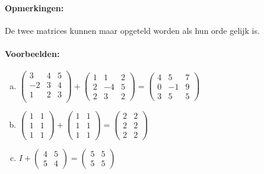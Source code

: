 \documentclass[12pt,twoside]{article}
\begin{document}
\paragraph*{Opmerkingen:} De twee matrices kunnen maar opgeteld worden als hun orde gelijk is.

\paragraph*{Voorbeelden:}

\begin{enumerate}[(a)]
\item
  $
  \begin{pmatrix}
    3 & 4 & 5\\
    -2 & 3 & 4\\
    1 & 2 & 3\\
  \end{pmatrix}
  +
  \begin{pmatrix}
    1 & 1 & 2\\
    2 & -4 & 5\\
    2 & 3 & 2
  \end{pmatrix}
  =
  \begin{pmatrix}
    4 & 5 & 7\\
    0 & -1 & 9\\
    3 & 5 & 5
  \end{pmatrix}
  $
\item
  $
  \begin{pmatrix}
    1 & 1\\
    1 & 1\\
    1 & 1
  \end{pmatrix}
  +
  \begin{pmatrix}
    1 & 1\\
    1 & 1\\
    1 & 1
  \end{pmatrix}
  =
    \begin{pmatrix}
    2 & 2\\
    2 & 2\\
    2 & 2
  \end{pmatrix}
  $
\item
  $
  I
  +
  \begin{pmatrix}
    4 & 5\\
    5 & 4
  \end{pmatrix}
  =
  \begin{pmatrix}
    5 & 5\\
    5 & 5
  \end{pmatrix}
  $
\end{enumerate}
\end{document}
